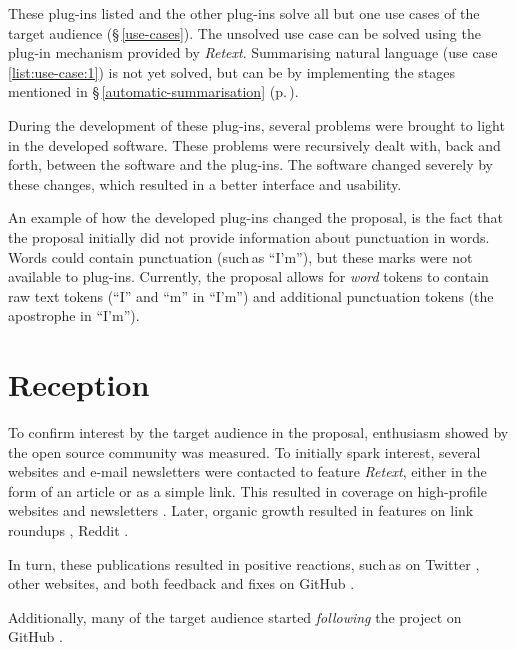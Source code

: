 \noindent These plug-ins listed and the other plug-ins solve all but one
  use cases of the target audience (§\,\ref{use-cases}).
The unsolved use case can be solved using the plug-in mechanism provided by
  \emph{Retext}.
Summarising natural language (use case \ref{list:use-case:1}) is not yet
  solved, but can be by implementing the stages mentioned in
  §\,\ref{automatic-summarisation} (p.\,\pageref{automatic-summarisation}).

During the development of these plug-ins, several problems were brought to
  light in the developed software.
These problems were recursively dealt with, back and forth, between the
  software and the plug-ins.
The software changed severely by these changes, which resulted in a
  better interface and usability.

An example of how the developed plug-ins changed the proposal, is the fact
  that the proposal initially did not provide information about punctuation
  in words.
Words could contain punctuation (such\,as ``I'm''), but these marks were not
  available to plug-ins.
Currently, the proposal allows for \emph{word} tokens to contain raw text
  tokens (``I'' and ``m'' in ``I'm'') and additional punctuation tokens (the
  apostrophe in ``I'm'').

\section{Reception}\label{reception}

To confirm interest by the target audience in the proposal, enthusiasm
  showed by the open source community was measured.
To initially spark interest, several websites and e-mail newsletters were
  contacted to feature \emph{Retext}, either in the form of an article or as
  a simple link.
This resulted in coverage on high-profile websites
  \autocite{dailyjs.com-natural-language-parsing-retext} and newsletters
  \autocites{nodeweekly.com-47}{javascriptweekly.com-193}
  {newspaper.io/javascript-2014-08-11}.
Later, organic growth resulted in features on link roundups
  \autocites{github.com-awesome-machine-learning}{github.com-awesome-nodejs},
  Reddit \autocites{reddit.com-mention-1}{reddit.com-mention-2}
  {reddit.com-mention-3}.

In turn, these publications resulted in positive reactions, such\,as on
  Twitter \autocites{twitter.com-mention-1}{twitter.com-mention-2}
  {twitter.com-mention-3}{twitter.com-mention-4}{twitter.com-mention-5}
  {twitter.com-mention-6}, other websites, and both feedback and fixes
  on GitHub \autocites{github.com-issue-1}{github.com-issue-2}
  {github.com-issue-3}{github.com-pull-request}.

Additionally, many of the target audience started \emph{following} the
  project on GitHub \autocite{github.com-stargazers}.

